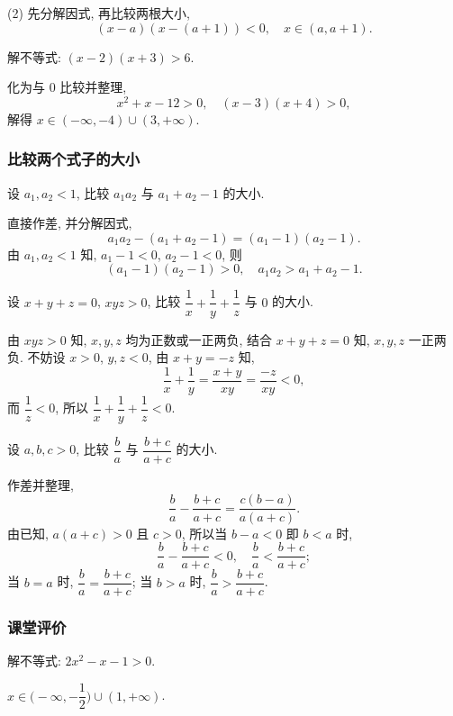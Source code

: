     (2) 先分解因式, 再比较两根大小,
    \[(x-a)(x-(a+1))< 0,\quad x\in(a,a+1).\]
\endsolution

\lianxi
\begin{exercise}[s]
    解不等式: $(x-2)(x+3)>6$.
\end{exercise}
\beginsolution
    化为与 $0$ 比较并整理,
    \[x^2+x-12> 0,\quad (x-3)(x+4)>0,\]
    解得 $x\in(-\infty,-4)\cup (3,+\infty)$.
\endsolution

\subsubsection{比较两个式子的大小}
\begin{example}
    设 $a_1,a_2<1$, 比较 $a_1a_2$ 与 $a_1+a_2-1$ 的大小.
\end{example}
\beginsolution
    直接作差, 并分解因式,
    \[a_1a_2-(a_1+a_2-1)= (a_1-1)(a_2-1).\]
    由 $a_1,a_2<1$ 知, $a_1-1<0$, $a_2-1<0$, 则
    \[(a_1-1)(a_2-1)>0,\quad a_1a_2> a_1+a_2-1.\]
\endsolution

\begin{example}
    设 $x+y+z=0$, $xyz>0$, 比较 $\dfrac1x+\dfrac1y+\dfrac1z$ 与 $0$ 的大小.
\end{example}
\beginsolution
    由 $xyz>0$ 知, $x,y,z$ 均为正数或一正两负, 结合 $x+y+z=0$ 知, $x,y,z$ 一正两负. 不妨设 $x>0$, $y,z< 0$, 由 $x+y= -z$ 知, 
    \[\frac1x+ \frac1y= \frac{x+y}{xy}= \frac{-z}{xy}<0,\]
    而 $\dfrac1z< 0$, 所以 $\dfrac1x+\dfrac1y+\dfrac1z< 0$.
\endsolution

\lianxi

\begin{exercise}
    设 $a,b,c>0$, 比较 $\dfrac{b}a$ 与 $\dfrac{b+c}{a+c}$ 的大小.
\end{exercise}
\beginsolution
    作差并整理, 
    \[\frac{b}a- \frac{b+c}{a+c}
    = \frac{c(b-a)}{a(a+c)}.\]
    由已知, $a(a+c)>0$ 且 $c>0$, 所以当 $b-a<0$ 即 $b<a$ 时, 
    \[\frac{b}a- \frac{b+c}{a+c}<0,\quad
    \frac{b}a< \frac{b+c}{a+c};\]
    当 $b=a$ 时, $\dfrac{b}a= \dfrac{b+c}{a+c}$; 当 $b>a$ 时, $\dfrac{b}a> \dfrac{b+c}{a+c}$.
\endsolution

\subsubsection{课堂评价}
\begin{exercise}
    解不等式: $2x^2 -x-1>0$.
\end{exercise}
\beginsolution
    $x\in\biggl(-\infty,-\dfrac12\biggr)\cup (1,+\infty)$.
\endsolution

